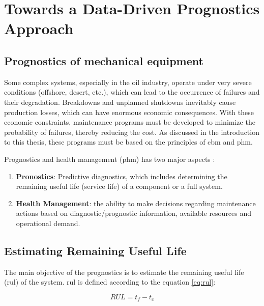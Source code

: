 \chapter{Towards a Data-Driven Prognostics Approach}


\section{Prognostics of mechanical equipment}
Some complex systems, especially in the oil industry, operate under very severe conditions (offshore, desert, etc.), which can lead to the occurrence of failures and their degradation. Breakdowns and unplanned shutdowns inevitably cause production losses, which can have enormous economic consequences. With these economic constraints, maintenance programs must be developed to minimize the probability of failures, thereby reducing the cost. As discussed in the introduction to this thesis, these programs must be based on the principles of \acrlong{cbm} and \acrlong{phm}.


Prognostics and health management (\acrlong{phm}) has two major aspects \cite{Hess2008}:

\begin{enumerate}
    \item \textbf{Pronostics}: Predictive diagnostics, which includes determining the remaining useful life (service life) of a component or a full system.
    \item \textbf{Health Management}: the ability to make decisions regarding maintenance actions based on diagnostic/prognostic information, available resources and operational demand.
\end{enumerate}

\section{Estimating Remaining Useful Life}
\label{section:rul}
\label{section:rul-estimation}
The main objective of the prognostics is to estimate the remaining useful life (\acrlong{rul}) of the system.
\acrshort{rul} is defined according to the equation \ref{eq:rul}:

\begin{equation}
    RUL = t_f-t_c
    \label{eq:rul}
\end{equation}


